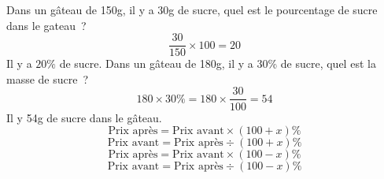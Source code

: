 \documentclass{thecours}
\begin{document}
    Dans un gâteau de 150g, il y a 30g de sucre, quel est le pourcentage de
    sucre dans le gateau~?
    $$\dfrac{30}{150}\times100=20$$
    Il y a $20\%$ de sucre.
    Dans un gâteau de 180g, il y a 30\% de sucre, quel est la masse de sucre~?
    $$180\times30\%=180\times\dfrac{30}{100}=54$$
    Il y 54g de sucre dans le gâteau.
    $$\text{Prix après}=\text{Prix avant}\times(100+x)\%$$
    $$\text{Prix avant}=\text{Prix après}\div(100+x)\%$$
    $$\text{Prix après}=\text{Prix avant}\times(100-x)\%$$
    $$\text{Prix avant}=\text{Prix après}\div(100-x)\%$$
\end{document}
